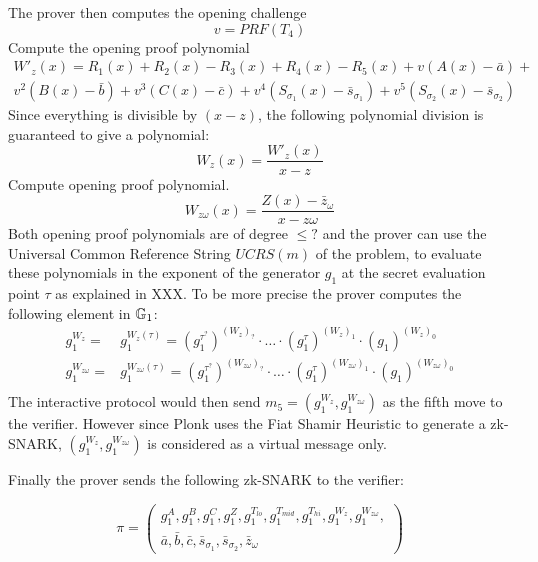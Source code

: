The prover then computes the opening challenge 
\begin{equation}
v=PRF(T_4)
\end{equation}
Compute the opening proof polynomial
\begin{multline}
W'_z(x) = R_1(x) + R_2(x) - R_3(x) + R_4(x)-R_5(x) + v(A(x) - \bar{a}) + \\
v^2(B(x) - \bar{b}) + v^3(C(x) - \bar{c}) + v^4(S_{\sigma_1}(x) - \bar{s}_{\sigma_1})
+ v^5(S_{\sigma_2}(x) - \bar{s}_{\sigma_2})
\end{multline}
Since everything is divisible by $(x-z)$, the following polynomial division is guaranteed to give a polynomial:
\begin{equation}
W_z(x) = \frac{W'_z(x)}{x-z}
\end{equation} 
Compute opening proof polynomial.
\begin{equation}
W_{z\omega}(x) = \frac{Z(x) - \bar{z}_\omega}{x - z\omega}
\end{equation}
Both opening proof polynomials are of degree $\leq ?$ and the prover can use the Universal Common Reference String $UCRS(m)$ of the problem, to evaluate these polynomials in the exponent of the generator $g_1$ at the secret evaluation point $\tau$ as explained in XXX. To be more precise the prover computes the following element in $\mathbb{G}_1$: 
\begin{equation}
\begin{array}{rl}
g_1^{W_z} = & g_1^{W_z(\tau)} = \left(g_1^{\tau^{?}}\right)^{(W_z)_{?}}\cdot\ldots\cdot \left(g_1^{\tau}\right)^{(W_z)_{1}}\cdot \left(g_1\right)^{(W_z)_{0}}\\
g_1^{W_{z\omega}} = & g_1^{W_{z\omega}(\tau)} = \left(g_1^{\tau^{?}}\right)^{(W_{z\omega})_{?}}\cdot\ldots\cdot \left(g_1^{\tau}\right)^{(W_{z\omega})_{1}}\cdot \left(g_1\right)^{(W_{z\omega})_{0}}\\
\end{array}
\end{equation}
The interactive protocol would then send $m_5=(g_1^{W_{z}}, g_1^{W_{z\omega}})$ as the fifth move to the verifier. However since Plonk uses the Fiat Shamir Heuristic to generate a zk-SNARK, $(g_1^{W_{z}}, g_1^{W_{z\omega}})$ is considered as a virtual message only.

Finally the prover sends the following zk-SNARK to the verifier:

\begin{equation}
\pi = \left(
\begin{array}{l}
g_1^A, g_1^B, g_1^C, g_1^Z, g_1^{T_{lo}},g_1^{T_{mid}}, g_1^{T_{hi}}, g_1^{W_z}, g_1^{W_{z\omega}}, \\
\bar{a}, \bar{b}, \bar{c}, \bar{s}_{\sigma_1}, \bar{s}_{\sigma_2}, \bar{z}_{\omega}
\end{array}
\right)
\end{equation}

